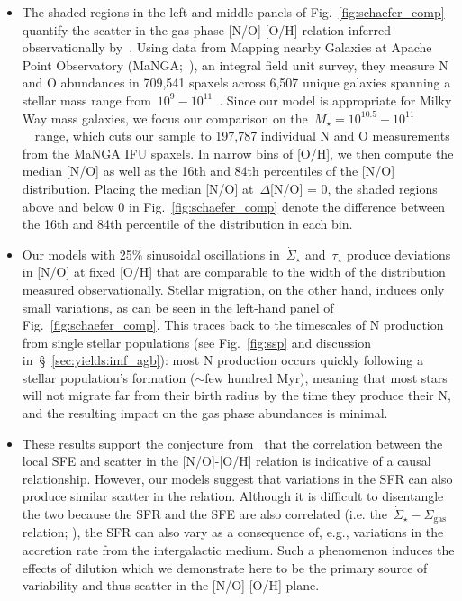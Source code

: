 \documentclass[ms.tex]{subfiles}
\begin{document}
\begin{itemize}
	\item The shaded regions in the left and middle panels of 
	Fig.~\ref{fig:schaefer_comp} quantify the scatter in the gas-phase 
	[N/O]-[O/H] relation inferred observationally by~\citet{Schaefer2020}. 
	Using data from Mapping nearby Galaxies at Apache Point Observatory 
	(MaNGA;~\citealp{Bundy2015}), an integral field unit survey, they measure 
	N and O abundances in 709,541 spaxels across 6,507 unique galaxies spanning 
	a stellar mass range from~$10^9 - 10^{11}$~\msun. 
	Since our model is appropriate for Milky Way mass galaxies, we focus our 
	comparison on the~$M_\star = 10^{10.5} - 10^{11}$~\msun~range, which cuts 
	our sample to 197,787 individual N and O measurements from the MaNGA IFU 
	spaxels. 
	In narrow bins of [O/H], we then compute the median [N/O] as well as the 
	16th and 84th percentiles of the [N/O] distribution. 
	Placing the median [N/O] at~$\Delta$[N/O] = 0, the shaded regions above and 
	below 0 in Fig.~\ref{fig:schaefer_comp} denote the difference between the 
	16th and 84th percentile of the distribution in each bin. 

	\item Our models with 25\% sinusoidal oscillations in~$\dot{\Sigma}_\star$ 
	and~$\tau_\star$ produce deviations in [N/O] at fixed [O/H] that are 
	comparable to the width of the distribution measured observationally. 
	Stellar migration, on the other hand, induces only small variations, as can 
	be seen in the left-hand panel of Fig.~\ref{fig:schaefer_comp}. 
	This traces back to the timescales of N production from single stellar 
	populations (see Fig.~\ref{fig:ssp} and discussion 
	in~\S~\ref{sec:yields:imf_agb}): most N production occurs quickly 
	following a stellar population's formation ($\sim$few hundred Myr), meaning 
	that most stars will not migrate far from their birth radius by the time 
	they produce their N, and the resulting impact on the gas phase abundances 
	is minimal. 

	\item These results support the conjecture from~\citet{Schaefer2020} that 
	the correlation between the local SFE and scatter in the [N/O]-[O/H] 
	relation is indicative of a causal relationship. 
	However, our models suggest that variations in the SFR can also produce 
	similar scatter in the relation. 
	Although it is difficult to disentangle the two because the SFR and the SFE 
	are also correlated (i.e. 
	the~$\dot{\Sigma}_\star - \Sigma_\text{gas}$ relation; 
	\citealp[e.g.][]{Kennicutt1998, delosReyes2019, Kennicutt2021}), the SFR 
	can also vary as a consequence of, e.g., variations in the accretion rate 
	from the intergalactic medium. 
	Such a phenomenon induces the effects of dilution which we demonstrate here 
	to be the primary source of variability and thus scatter in the [N/O]-[O/H] 
	plane. 


\end{itemize}
\end{document}
